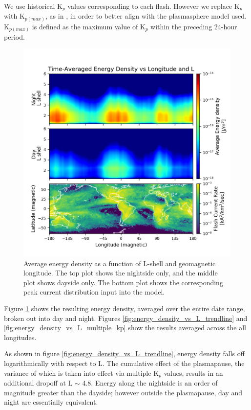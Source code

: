 We use historical K$_p$ values corresponding to each flash. However we replace K$_p$ with K$_{p(max)}$, as in \cite{Carpenter1992}, in order to better align with the plasmasphere model used. K$_{p(max)}$ is defined as the maximum value of K$_p$ within the preceding 24-hour period.

\begin{figure}[ht]
\begin{center}
\includegraphics{figures/Energy_density_daynite.png}
\caption[Average energy density vs longitude and L]{Average energy density as a function of L-shell and geomagnetic longitude. The top plot shows the nightside only, and the middle plot shows dayside only. The bottom plot shows the corresponding peak current distribution input into the model.}
\label{fig:energy_density_daynite}
\end{center}
\end{figure}

Figure \ref{fig:energy_density_daynite} shows the resulting energy density, averaged over the entire date range, broken out into day and night. Figures \ref{fig:energy_density_vs_L_trendline} and \ref{fig:energy_density_vs_L_multiple_kp} show the results averaged across the all longitudes.

As shown in figure \ref{fig:energy_density_vs_L_trendline}, energy density falls off logarithmically with respect to L. The cumulative effect of the plasmapause, the variance of which is taken into effect via multiple K$_p$ values, results in an additional dropoff at L $\sim$ 4.8. Energy along the nightside is an order of magnitude greater than the dayside; however outside the plasmapause, day and night are essentially equivalent.

